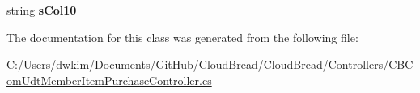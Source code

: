 \begin{DoxyCompactItemize}
\item 
string {\bfseries s\+Col10}\hypertarget{class_cloud_bread_1_1_controllers_1_1_c_b_com_udt_member_item_purchase_controller_1_1_input_params_a32f7167dc2f056a56fc3d8ce7e06a91c}{}\label{class_cloud_bread_1_1_controllers_1_1_c_b_com_udt_member_item_purchase_controller_1_1_input_params_a32f7167dc2f056a56fc3d8ce7e06a91c}

\end{DoxyCompactItemize}


The documentation for this class was generated from the following file\+:\begin{DoxyCompactItemize}
\item 
C\+:/\+Users/dwkim/\+Documents/\+Git\+Hub/\+Cloud\+Bread/\+Cloud\+Bread/\+Controllers/\hyperlink{_c_b_com_udt_member_item_purchase_controller_8cs}{C\+B\+Com\+Udt\+Member\+Item\+Purchase\+Controller.\+cs}\end{DoxyCompactItemize}
